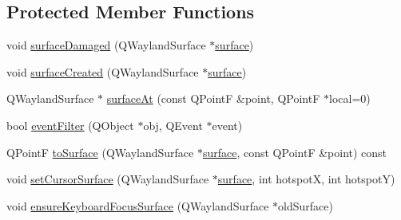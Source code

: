 \subsection*{Protected Member Functions}
\begin{DoxyCompactItemize}
\item 
void \hyperlink{classqtmotorcar_1_1QtWaylandMotorcarCompositor_a12ce718691bc19318acd23b981a72cb8}{surface\-Damaged} (Q\-Wayland\-Surface $\ast$\hyperlink{simple-egl_8cpp_a0720952aa1caded45b5bcdce589663a9}{surface})
\item 
void \hyperlink{classqtmotorcar_1_1QtWaylandMotorcarCompositor_a4bda9a0989cb8c22e7b5d1a687763b61}{surface\-Created} (Q\-Wayland\-Surface $\ast$\hyperlink{simple-egl_8cpp_a0720952aa1caded45b5bcdce589663a9}{surface})
\item 
Q\-Wayland\-Surface $\ast$ \hyperlink{classqtmotorcar_1_1QtWaylandMotorcarCompositor_adcc9307301b665c9d5ccea73fef01453}{surface\-At} (const Q\-Point\-F \&point, Q\-Point\-F $\ast$local=0)
\item 
bool \hyperlink{classqtmotorcar_1_1QtWaylandMotorcarCompositor_a1d5c76d5c4dfd029d90803d889c07206}{event\-Filter} (Q\-Object $\ast$obj, Q\-Event $\ast$event)
\item 
Q\-Point\-F \hyperlink{classqtmotorcar_1_1QtWaylandMotorcarCompositor_af3c3c2e2dbfd18427c8b38f83f0fa01f}{to\-Surface} (Q\-Wayland\-Surface $\ast$\hyperlink{simple-egl_8cpp_a0720952aa1caded45b5bcdce589663a9}{surface}, const Q\-Point\-F \&point) const 
\item 
void \hyperlink{classqtmotorcar_1_1QtWaylandMotorcarCompositor_a4555fa6ed0c867668fe735d9192331c7}{set\-Cursor\-Surface} (Q\-Wayland\-Surface $\ast$\hyperlink{simple-egl_8cpp_a0720952aa1caded45b5bcdce589663a9}{surface}, int hotspot\-X, int hotspot\-Y)
\item 
void \hyperlink{classqtmotorcar_1_1QtWaylandMotorcarCompositor_ac2210c9eaefdc154eac4111807232eb0}{ensure\-Keyboard\-Focus\-Surface} (Q\-Wayland\-Surface $\ast$old\-Surface)
\end{DoxyCompactItemize}


